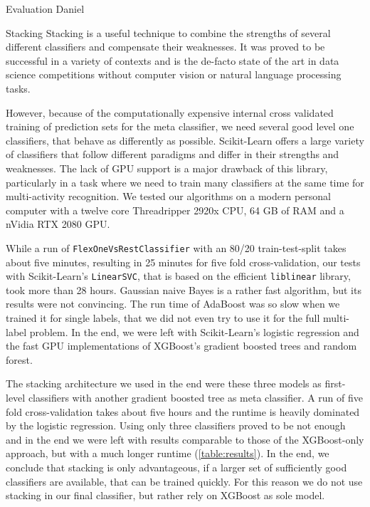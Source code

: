 \begin{section}{Evaluation Daniel}
	\begin{subsection}{Stacking}
		Stacking is a useful technique to combine the strengths of several different classifiers and compensate their weaknesses. It was proved to be successful in a variety of contexts and is the de-facto state of the art in data science competitions without computer vision or natural language processing tasks.
		
		However, because of the computationally expensive internal cross validated training of prediction sets for the meta classifier, we need several good level one classifiers, that behave as differently as possible. Scikit-Learn offers a large variety of classifiers that follow different paradigms and differ in their strengths and weaknesses. The lack of GPU support is a major drawback of this library, particularly in a task where we need to train many classifiers at the same time for multi-activity recognition. We tested our algorithms on a modern personal computer with a twelve core Threadripper 2920x CPU, 64 GB of RAM and a nVidia RTX 2080 GPU.
		
		While a run of \texttt{FlexOneVsRestClassifier} with an 80/20 train-test-split takes about five minutes, resulting in 25 minutes for five fold  cross-validation, our tests with Scikit-Learn's \texttt{LinearSVC}, that is based on the efficient \texttt{liblinear} library, took more than 28 hours. Gaussian naive Bayes is a rather fast algorithm, but its results were not convincing. The run time of AdaBoost was so slow when we trained it for single labels, that we did not even try to use it for the full multi-label problem. In the end, we were left with Scikit-Learn's logistic regression and the fast GPU implementations of XGBoost's gradient boosted trees and random forest.
		
		The stacking architecture we used in the end were these three models as first-level classifiers with another gradient boosted tree as meta classifier. A run of five fold cross-validation takes about five hours and the runtime is heavily dominated by the logistic regression. Using only three classifiers proved to be not enough and in the end we were left with results comparable to those of the XGBoost-only approach, but with a much longer runtime (\ref{table:results}). In the end, we conclude that stacking is only advantageous, if a larger set of sufficiently good classifiers are available, that can be trained quickly. For this reason we do not use stacking in our final classifier, but rather rely on XGBoost as sole model.
	\end{subsection}


\end{section}
